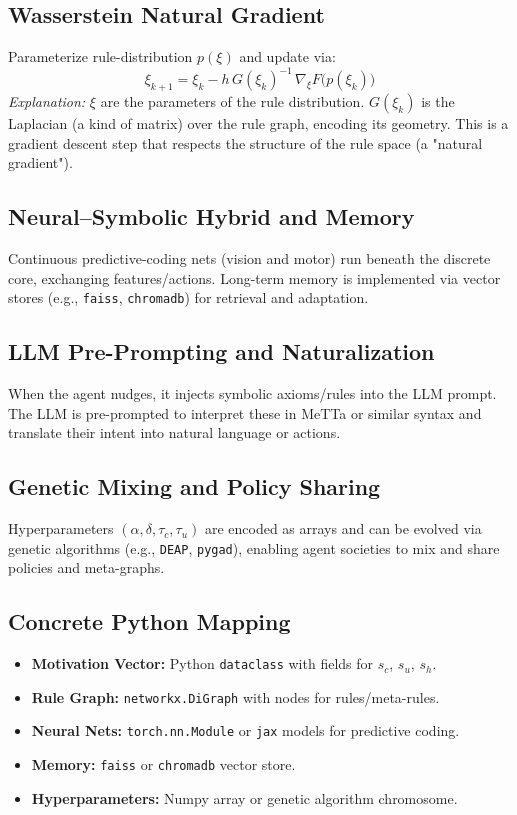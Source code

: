 \documentclass[11pt]{article}
\begin{document}
\subsection{Wasserstein Natural Gradient}
Parameterize rule-distribution $p(\xi)$ and update via:
\[
  \xi_{k+1} = \xi_k - h\,G(\xi_k)^{-1}\,\nabla_{\xi}F\bigl(p(\xi_k)\bigr)
\]
\textit{Explanation:} $\xi$ are the parameters of the rule distribution. $G(\xi_k)$ is the Laplacian (a kind of matrix) over the rule graph, encoding its geometry. This is a gradient descent step that respects the structure of the rule space (a "natural gradient").

\subsection{Neural–Symbolic Hybrid and Memory}
Continuous predictive-coding nets (vision and motor) run beneath the discrete core, exchanging features/actions. Long-term memory is implemented via vector stores (e.g., \texttt{faiss}, \texttt{chromadb}) for retrieval and adaptation.

\subsection{LLM Pre-Prompting and Naturalization}
When the agent nudges, it injects symbolic axioms/rules into the LLM prompt. The LLM is pre-prompted to interpret these in MeTTa or similar syntax and translate their intent into natural language or actions.

\subsection{Genetic Mixing and Policy Sharing}
Hyperparameters $(\alpha,\delta,\tau_c,\tau_u)$ are encoded as arrays and can be evolved via genetic algorithms (e.g., \texttt{DEAP}, \texttt{pygad}), enabling agent societies to mix and share policies and meta-graphs.

\subsection{Concrete Python Mapping}
\begin{itemize}
  \item \textbf{Motivation Vector:} Python \texttt{dataclass} with fields for $s_c$, $s_u$, $s_h$.
  \item \textbf{Rule Graph:} \texttt{networkx.DiGraph} with nodes for rules/meta-rules.
  \item \textbf{Neural Nets:} \texttt{torch.nn.Module} or \texttt{jax} models for predictive coding.
  \item \textbf{Memory:} \texttt{faiss} or \texttt{chromadb} vector store.
  \item \textbf{Hyperparameters:} Numpy array or genetic algorithm chromosome.
\end{itemize}
\end{document}
